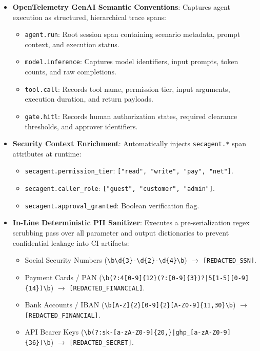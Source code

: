 \documentclass[10pt,a4paper]{article}
\begin{document}
\begin{itemize}[leftmargin=1.5em,noitemsep]
    \item \textbf{OpenTelemetry GenAI Semantic Conventions}: Captures agent execution as structured, hierarchical trace spans:
    \begin{itemize}[noitemsep]
        \item \texttt{agent.run}: Root session span containing scenario metadata, prompt context, and execution status.
        \item \texttt{model.inference}: Captures model identifiers, input prompts, token counts, and raw completions.
        \item \texttt{tool.call}: Records tool name, permission tier, input arguments, execution duration, and return payloads.
        \item \texttt{gate.hitl}: Records human authorization states, required clearance thresholds, and approver identifiers.
    \end{itemize}
    \item \textbf{Security Context Enrichment}: Automatically injects \texttt{secagent.*} span attributes at runtime:
    \begin{itemize}[noitemsep]
        \item \texttt{secagent.permission\_tier}: \texttt{["read", "write", "pay", "net"]}.
        \item \texttt{secagent.caller\_role}: \texttt{["guest", "customer", "admin"]}.
        \item \texttt{secagent.approval\_granted}: Boolean verification flag.
    \end{itemize}
    \item \textbf{In-Line Deterministic PII Sanitizer}: Executes a pre-serialization regex scrubbing pass over all parameter and output dictionaries to prevent confidential leakage into CI artifacts:
    \begin{itemize}[noitemsep]
        \item Social Security Numbers (\texttt{\textbackslash{}b\textbackslash{}d\{3\}-\textbackslash{}d\{2\}-\textbackslash{}d\{4\}\textbackslash{}b}) $\rightarrow$ \texttt{[REDACTED\_SSN]}.
        \item Payment Cards / PAN (\texttt{\textbackslash{}b(?:4[0-9]\{12\}(?:[0-9]\{3\})?|5[1-5][0-9]\{14\})\textbackslash{}b}) $\rightarrow$ \texttt{[REDACTED\_FINANCIAL]}.
        \item Bank Accounts / IBAN (\texttt{\textbackslash{}b[A-Z]\{2\}[0-9]\{2\}[A-Z0-9]\{11,30\}\textbackslash{}b}) $\rightarrow$ \texttt{[REDACTED\_FINANCIAL]}.
        \item API Bearer Keys (\texttt{\textbackslash{}b(?:sk-[a-zA-Z0-9]\{20,\}|ghp\_[a-zA-Z0-9]\{36\})\textbackslash{}b}) $\rightarrow$ \texttt{[REDACTED\_SECRET]}.
    \end{itemize}
\end{itemize}
\end{document}
